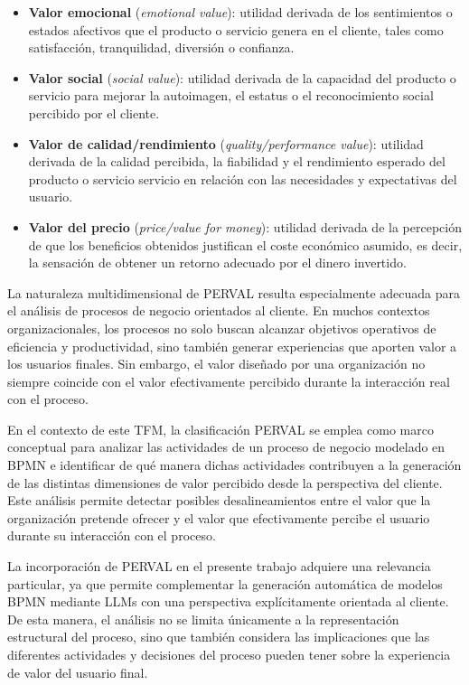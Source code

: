 \begin{itemize}
    \item[$\bullet$] \textbf{Valor emocional} (\textit{emotional value}): utilidad derivada de los sentimientos o estados afectivos que  el producto o servicio genera en el cliente, tales como satisfacción, tranquilidad, diversión o confianza.
    
    \item[$\bullet$] \textbf{Valor social} (\textit{social value}): utilidad derivada de la capacidad del producto o servicio para mejorar la autoimagen, el estatus o el reconocimiento social  percibido por el cliente.
    
    \item[$\bullet$] \textbf{Valor de calidad/rendimiento} (\textit{quality/performance value}): utilidad derivada de la calidad percibida, la fiabilidad y el rendimiento esperado del producto o servicio servicio en relación con las necesidades y expectativas del usuario.
    
    \item[$\bullet$] \textbf{Valor del precio} (\textit{price/value for money}): utilidad derivada de  la percepción de que los beneficios obtenidos justifican el coste económico asumido, es decir, la sensación de obtener un retorno adecuado  por el dinero invertido.
\end{itemize}

La naturaleza multidimensional de PERVAL resulta especialmente adecuada para el análisis de procesos de negocio orientados al cliente. En muchos contextos organizacionales, los procesos no solo buscan alcanzar objetivos operativos de eficiencia y productividad, sino también generar experiencias que aporten valor a los usuarios finales. Sin embargo, el valor diseñado por una organización no siempre coincide con el valor efectivamente percibido durante la interacción real con el proceso.

En el contexto de este TFM, la clasificación PERVAL se emplea como marco conceptual  para analizar las actividades de un proceso de negocio modelado en BPMN e identificar de qué manera dichas actividades contribuyen a la generación de las distintas dimensiones  de valor percibido desde la perspectiva del cliente. Este análisis permite detectar posibles desalineamientos entre el valor  que la organización pretende ofrecer y el valor que efectivamente percibe el usuario durante su interacción con el proceso.

La incorporación de PERVAL en el presente trabajo adquiere una relevancia particular, ya que permite complementar la generación automática de modelos BPMN mediante LLMs con una perspectiva explícitamente orientada al cliente. De esta manera, el análisis no se limita únicamente a la representación estructural del proceso, sino que también considera las implicaciones que las diferentes actividades y decisiones del proceso pueden tener sobre la experiencia de valor del usuario final.

